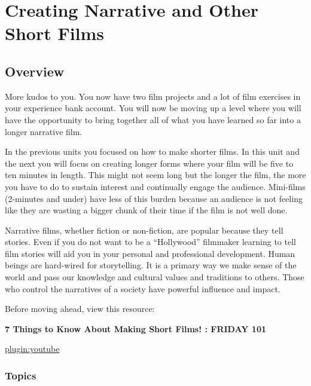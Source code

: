 \documentclass[
]{book}
\begin{document}
\hypertarget{creating-narrative-and-other-short-films}{%
\chapter{Creating Narrative and Other Short Films}\label{creating-narrative-and-other-short-films}}

\hypertarget{overview-7}{%
\section*{Overview}\label{overview-7}}

More kudos to you. You now have two film projects and a lot of film exercises in your experience bank account. You will now be moving up a level where you will have the opportunity to bring together all of what you have learned so far into a longer narrative film.

In the previous units you focused on how to make shorter films. In this unit and the next you will focus on creating longer forms where your film will be five to ten minutes in length. This might not seem long but the longer the film, the more you have to do to sustain interest and continually engage the audience. Mini-films (2-minutes and under) have less of this burden because an audience is not feeling like they are wasting a bigger chunk of their time if the film is not well done.

Narrative films, whether fiction or non-fiction, are popular because they tell stories. Even if you do not want to be a ``Hollywood'' filmmaker learning to tell film stories will aid you in your personal and professional development. Human beings are hard-wired for storytelling. It is a primary way we make sense of the world and pass our knowledge and cultural values and traditions to others. Those who control the narratives of a society have powerful influence and impact.

Before moving ahead, view this resource:

\textbf{7 Things to Know About Making Short Films! : FRIDAY 101}

\href{https://www.youtube.com/watch?v=mYnsKATCrdw}{plugin:youtube}

\hypertarget{topics-7}{%
\subsection*{Topics}\label{topics-7}}
\end{document}
